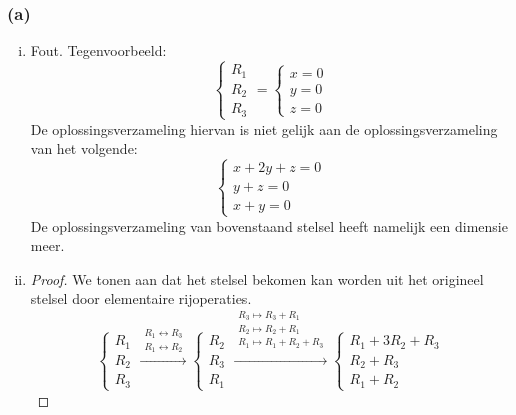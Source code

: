 \documentclass[lineaire_algebra_oplossingen.tex]{subfiles}
\begin{document}
\subsubsection*{(a)}
\begin{enumerate}[i.]
\item
Fout. Tegenvoorbeeld:
\[
\left\{
\begin{array}{c}
R_1\\R_2\\R_3
\end{array}
\right.
=
\left\{
\begin{array}{c}
x=0\\
y=0\\
z=0
\end{array}
\right.
\]
De oplossingsverzameling hiervan is niet gelijk aan de oplossingsverzameling van het volgende:
\[
\left\{
\begin{array}{c}
x+2y+z=0\\
y+z=0\\
x+y=0
\end{array}
\right.
\]
De oplossingsverzameling van bovenstaand stelsel heeft namelijk een dimensie meer.

\item
\begin{proof}
We tonen aan dat het stelsel bekomen kan worden uit het origineel stelsel door elementaire rijoperaties.
\[
\left\{
\begin{array}{c}
R_1\\R_2\\R_3
\end{array}
\right.
\overset{\begin{array}{c}
R_1 \leftrightarrow R_3\\
R_1 \leftrightarrow R_2
\end{array}}{\longrightarrow}
\left\{
\begin{array}{c}
R_2\\R_3\\R_1
\end{array}
\right.
\overset{\begin{array}{c}
R_3 \mapsto R_3+R_1\\
R_2 \mapsto R_2+R_1\\
R_1 \mapsto R_1+R_2+R_3\\
\end{array}}{\longrightarrow}
\left\{
\begin{array}{c}
R_1+3R_2+R_3\\R_2+R_3\\R_1+R_2
\end{array}
\right.
\]
\end{proof}

\end{enumerate}
\end{document}

